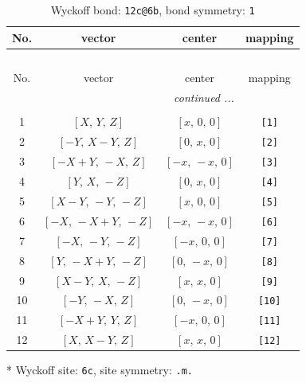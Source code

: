 \documentclass[fleqn,8pt]{jsarticle}
\begin{document}
\begin{longtable}{cccc}
\caption{Wyckoff bond: {\tt 12c@6b}, bond symmetry: {\tt 1}}
 \\
 \hline \hline
No. & vector & center & mapping \\ \hline \endfirsthead

\multicolumn{3}{l}{\tablename\ \thetable{}} \\
 \hline \hline
No. & vector & center & mapping \\ \hline \endhead

 \hline \hline
\multicolumn{3}{r}{\footnotesize\it continued ...} \\ \endfoot

 \hline \hline
\multicolumn{3}{r}{} \\ \endlastfoot

1 & $\left[ X,\, Y,\, Z \right]$ & $\left[ x,\, 0,\, 0 \right]$ & {\tt [1]} \\ \hline
2 & $\left[ - Y,\, X - Y,\, Z \right]$ & $\left[ 0,\, x,\, 0 \right]$ & {\tt [2]} \\ \hline
3 & $\left[ - X + Y,\, - X,\, Z \right]$ & $\left[ - x,\, - x,\, 0 \right]$ & {\tt [3]} \\ \hline
4 & $\left[ Y,\, X,\, - Z \right]$ & $\left[ 0,\, x,\, 0 \right]$ & {\tt [4]} \\ \hline
5 & $\left[ X - Y,\, - Y,\, - Z \right]$ & $\left[ x,\, 0,\, 0 \right]$ & {\tt [5]} \\ \hline
6 & $\left[ - X,\, - X + Y,\, - Z \right]$ & $\left[ - x,\, - x,\, 0 \right]$ & {\tt [6]} \\ \hline
7 & $\left[ - X,\, - Y,\, - Z \right]$ & $\left[ - x,\, 0,\, 0 \right]$ & {\tt [7]} \\ \hline
8 & $\left[ Y,\, - X + Y,\, - Z \right]$ & $\left[ 0,\, - x,\, 0 \right]$ & {\tt [8]} \\ \hline
9 & $\left[ X - Y,\, X,\, - Z \right]$ & $\left[ x,\, x,\, 0 \right]$ & {\tt [9]} \\ \hline
10 & $\left[ - Y,\, - X,\, Z \right]$ & $\left[ 0,\, - x,\, 0 \right]$ & {\tt [10]} \\ \hline
11 & $\left[ - X + Y,\, Y,\, Z \right]$ & $\left[ - x,\, 0,\, 0 \right]$ & {\tt [11]} \\ \hline
12 & $\left[ X,\, X - Y,\, Z \right]$ & $\left[ x,\, x,\, 0 \right]$ & {\tt [12]} \\
\end{longtable}
* Wyckoff site: {\tt 6c}, site symmetry: {\tt .m.}
\renewcommand{\arraystretch}{1.2}
\end{document}
